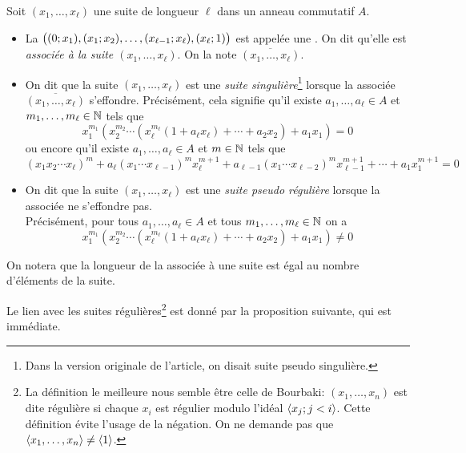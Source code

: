 \begin{definition}{\rm  
\label{defproch} 
Soit  $(x_1,\ldots,x_\ell)$ une suite de longueur $\ell$ dans un anneau 
commutatif $A$. 
\begin{itemize}
\item  La \proc $\big((0;x_1),(x_1;x_2),\allowbreak\ldots, 
(x_{\ell-1};x_\ell),(x_\ell;1)\big)$ est appelée une {\em \proel}. 
On dit qu'elle est {\em associée à la suite $(x_1,\ldots,x_\ell)$}.
On la note $\overline{(x_1,\ldots,x_\ell)}$.
\item  On dit que la suite 
$(x_1,\ldots,x_\ell)$ est une {\em suite singu\-lière}\footnote{Dans la version originale de l'article, on disait suite pseudo  singu\-lière.} 
lorsque
la \proel associée $\overline{(x_1,\ldots,x_\ell)}$ s'effondre. 
Précisément, cela signifie qu'il existe $a_1,\ldots,a_\ell\in A$ et 
$m_1,\ldots,m_\ell\in \mathbb{N}$ tels que
\begin{equation} \label {eqdefproch4}
 x_1^{m_1}(x_2^{m_2}\cdots(x_\ell^{m_\ell} (1+a_\ell x_\ell) + 
\cdots+a_2x_2) + a_1x_1) =  0
\end{equation}
ou encore qu'il existe $a_1,\ldots,a_\ell\in A$ et $m\in \mathbb{N}$ tels que
$$ (x_1x_2\cdots x_\ell)^{m} +
a_\ell (x_1\cdots x_{\ell-1})^{m}x_\ell^{m+1} + 
a_{\ell-1} (x_1\cdots x_{\ell-2})^{m}x_{\ell-1}^{m+1} + 
\cdots+
a_{1} x_1^{m+1} =  0
$$
\item   On dit que la suite 
$(x_1,\ldots,x_\ell)$ est une {\em suite pseudo ré\-gu\-liè\-re} 
lorsque
la \proel associée ne s'effondre pas. \\
Précisément,
pour tous $a_1,\ldots,a_\ell\in A$ et tous $m_1,\ldots,m_\ell\in \mathbb{N}$ on 
a  
$$ x_1^{m_1}(x_2^{m_2}\cdots(x_\ell^{m_\ell} (1+a_\ell x_\ell) + 
\cdots+a_2x_2) + a_1x_1) \neq  0
$$
\end{itemize}
}
\end{definition}
On notera que la longueur de la \proel associée à une suite est égal 
au nombre d'éléments de la suite.

Le lien avec les suites régulières\footnote{La définition le meilleure 
nous semble être celle de Bourbaki: $(x_1,\dots,x_n)$ est dite régulière si chaque $x_i$ est régulier modulo l'idéal $\left\langle{x_j;j<i}\right\rangle$. Cette définition évite l'usage de la négation. On ne demande pas que $\left\langle{x_1,\dots,x_n}\right\rangle\neq \left\langle{1}\right\rangle$.} est donné par la proposition 
suivante, qui est immédiate. 

